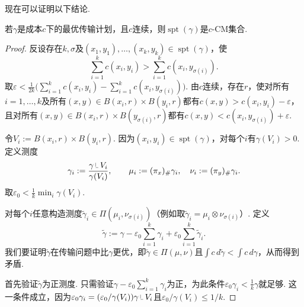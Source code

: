 现在可以证明以下结论.

\begin{theorem}\label{obj:1.38}
若$\gamma$是成本$c$下的最优传输计划，且$c$连续，则$\operatorname{spt}(\gamma)$是$c$-CM集合.
\end{theorem}
\begin{proof}
反设存在$k,\sigma$及$(x_1,y_1),\ldots,(x_k,y_k)\in\operatorname{spt}(\gamma)$，使
\[
\sum_{i=1}^k c(x_i,y_i)>\sum_{i=1}^k c(x_i,y_{\sigma(i)}).
\]
取$\varepsilon<\frac1{2k}\bigl(\sum_{i=1}^k c(x_i,y_i)-\sum_{i=1}^k c(x_i,y_{\sigma(i)})\bigr)$. 由$c$连续，存在$r$，使对所有$i=1,\ldots,k$及所有$(x,y)\in B(x_i,r)\times B(y_i,r)$都有$c(x,y)>c(x_i,y_i)-\varepsilon$，且对所有$(x,y)\in B(x_i,r)\times B(y_{\sigma(i)},r)$都有$c(x,y)<c(x_i,y_{\sigma(i)})+\varepsilon$.

令$V_i:=B(x_i,r)\times B(y_i,r)$. 因为$(x_i,y_i)\in\operatorname{spt}(\gamma)$，对每个$i$有$\gamma(V_i)>0$. 定义测度
\[
\gamma_i:=\frac{\gamma\mathbin{\vrule height 1.4ex depth -.3ex width .07ex\vrule height .07ex depth 0ex width .7ex}V_i}{\gamma(V_i)},
\qquad\mu_i:=(\pi_x)_\#\gamma_i,\quad\nu_i:=(\pi_y)_\#\gamma_i.
\]
取$\varepsilon_0<\frac1k\min_i\gamma(V_i)$.

对每个$i$任意构造测度$\widetilde\gamma_i\in\Pi(\mu_i,\nu_{\sigma(i)})$（例如取$\widetilde\gamma_i=\mu_i\otimes\nu_{\sigma(i)}$）. 定义
\[
\widetilde\gamma:=\gamma-\varepsilon_0\sum_{i=1}^k\gamma_i
+\varepsilon_0\sum_{i=1}^k\widetilde\gamma_i.
\]
我们要证明$\widetilde\gamma$在传输问题中比$\gamma$更优，即$\widetilde\gamma\in\Pi(\mu,\nu)$且$\int c\,d\widetilde\gamma<\int c\,d\gamma$，从而得到矛盾.

首先验证$\widetilde\gamma$为正测度. 只需验证$\gamma-\varepsilon_0\sum_{i=1}^k\gamma_i$为正，为此条件$\varepsilon_0\gamma_i<\frac1k\gamma$就足够. 这一条件成立，因为$\varepsilon_0\gamma_i=(\varepsilon_0/\gamma(V_i))\gamma\mathbin{\vrule height 1.4ex depth -.3ex width .07ex\vrule height .07ex depth 0ex width .7ex}V_i$且$\varepsilon_0/\gamma(V_i)\le1/k$.


\end{proof}
